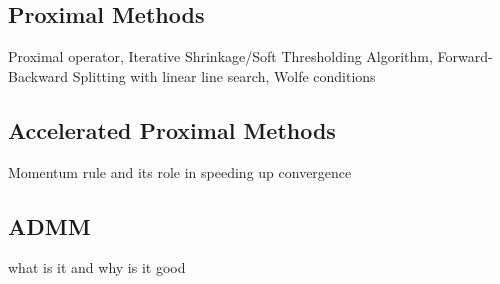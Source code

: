 \subsection{Proximal Methods}
Proximal operator, Iterative Shrinkage/Soft Thresholding Algorithm, Forward-Backward Splitting with linear line search, Wolfe conditions

\subsection{Accelerated Proximal Methods}
Momentum rule and its role in speeding up convergence

\subsection{ADMM}
what is it and why is it good

\clearpage
